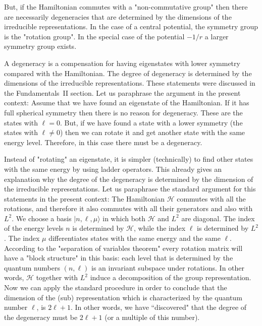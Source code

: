 \documentclass[onecolumn,fleqn, 11pt]{revtex4}
\begin{document}
But, if the Hamiltonian commutes with 
a "non-commutative group" then there 
are necessarily degeneracies that are 
determined by the dimensions of the irreducible 
representations. In the case of a central potential, 
the symmetry group is the "rotation group". 
In the special case of the potential ${-1/r}$ 
a larger symmetry group exists. 


A degeneracy is a compensation for having  
eigenstates with lower symmetry compared with the Hamiltonian. 
The degree of degeneracy is determined 
by the dimensions of the irreducible representations. 
These statements were discussed 
in the Fundamentals~II section.
Let us paraphrase the argument in the present context: 
Assume that we have found an eigenstate of the Hamiltonian. 
If it has full spherical symmetry then there is no reason for degeneracy. 
These are the states with ${\ell=0}$. 
But, if we have found a state with a lower symmetry 
(the states with ${ \ell \ne 0 }$) then we can rotate 
it and get another state with the same energy level. 
Therefore, in this case there must be a degeneracy. 


Instead of "rotating" an eigenstate, it is simpler (technically) 
to find other states with the same energy by using ladder 
operators. This already gives an explanation why the degree 
of the degeneracy is determined by the dimension of the irreducible 
representations. Let us paraphrase the standard argument 
for this statements in the present context: 
The Hamiltonian ${\mathcal{H}}$ commutes with all the rotations, 
and therefore it also commutes with all their generators and 
also with ${L^2}$. We choose a basis ${|n ,\ell, \mu \rangle}$ 
in which both ${\mathcal{H}}$ and ${L^2}$ are diagonal. 
The index of the energy levels $n$ is determined by ${\mathcal{H}}$, 
while the index $\ell$ is determined by ${L^2}$. 
The index ${\mu}$ differentiates states with the same 
energy and the same ${\ell}$. 
According to the "separation of variables theorem" every rotation 
matrix will have a "block structure" in this basis: each level 
that is determined by the quantum numbers ${(n,\ell)}$ 
is an invariant subspace under rotations. 
In other words, ${\mathcal{H}}$ together with ${L^2}$ induce 
a decomposition of the group representation. 
Now we can apply the standard procedure in order to conclude 
that the dimension of the (sub) representation 
which is characterized by the quantum number ${\ell}$, is ${2\ell+1}$. 
In other words, we have ``discovered" that the degree of the 
degeneracy must be ${2\ell+1}$ (or a multiple of this number). 
\end{document}
